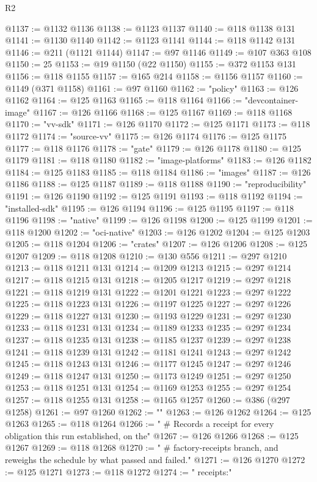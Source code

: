 \begin{lexlean}{R2}
\begin{coremodule}
@1137 := @1132 @1136
@1138 := @1123 @1137
@1140 := @118 @1138 @131
@1141 := @1130 @1140
@1142 := @1123 @1141
@1144 := @118 @1142 @131
@1146 := @211 (@1121 @1144)
@1147 := @97 @1146
@1149 := @107 @363 @108
@1150 := 25
@1153 := @19 @1150 (@22 @1150)
@1155 := @372 @1153 @131
@1156 := @118 @1155
@1157 := @165 @214
@1158 := @1156 @1157
@1160 := @1149 (@371 @1158)
@1161 := @97 @1160
@1162 := "policy"
@1163 := @126 @1162
@1164 := @125 @1163
@1165 := @118 @1164
@1166 := "devcontainer-image"
@1167 := @126 @1166
@1168 := @125 @1167
@1169 := @118 @1168
@1170 := "vv-sdk"
@1171 := @126 @1170
@1172 := @125 @1171
@1173 := @118 @1172
@1174 := "source-vv"
@1175 := @126 @1174
@1176 := @125 @1175
@1177 := @118 @1176
@1178 := "gate"
@1179 := @126 @1178
@1180 := @125 @1179
@1181 := @118 @1180
@1182 := "image-platforms"
@1183 := @126 @1182
@1184 := @125 @1183
@1185 := @118 @1184
@1186 := "images"
@1187 := @126 @1186
@1188 := @125 @1187
@1189 := @118 @1188
@1190 := "reproducibility"
@1191 := @126 @1190
@1192 := @125 @1191
@1193 := @118 @1192
@1194 := "installed-sdk"
@1195 := @126 @1194
@1196 := @125 @1195
@1197 := @118 @1196
@1198 := "native"
@1199 := @126 @1198
@1200 := @125 @1199
@1201 := @118 @1200
@1202 := "oci-native"
@1203 := @126 @1202
@1204 := @125 @1203
@1205 := @118 @1204
@1206 := "crates"
@1207 := @126 @1206
@1208 := @125 @1207
@1209 := @118 @1208
@1210 := @130 @556
@1211 := @297 @1210
@1213 := @118 @1211 @131
@1214 := @1209 @1213
@1215 := @297 @1214
@1217 := @118 @1215 @131
@1218 := @1205 @1217
@1219 := @297 @1218
@1221 := @118 @1219 @131
@1222 := @1201 @1221
@1223 := @297 @1222
@1225 := @118 @1223 @131
@1226 := @1197 @1225
@1227 := @297 @1226
@1229 := @118 @1227 @131
@1230 := @1193 @1229
@1231 := @297 @1230
@1233 := @118 @1231 @131
@1234 := @1189 @1233
@1235 := @297 @1234
@1237 := @118 @1235 @131
@1238 := @1185 @1237
@1239 := @297 @1238
@1241 := @118 @1239 @131
@1242 := @1181 @1241
@1243 := @297 @1242
@1245 := @118 @1243 @131
@1246 := @1177 @1245
@1247 := @297 @1246
@1249 := @118 @1247 @131
@1250 := @1173 @1249
@1251 := @297 @1250
@1253 := @118 @1251 @131
@1254 := @1169 @1253
@1255 := @297 @1254
@1257 := @118 @1255 @131
@1258 := @1165 @1257
@1260 := @386 (@297 @1258)
@1261 := @97 @1260
@1262 := ""
@1263 := @126 @1262
@1264 := @125 @1263
@1265 := @118 @1264
@1266 := "  # Records a receipt for every obligation this run established, on the"
@1267 := @126 @1266
@1268 := @125 @1267
@1269 := @118 @1268
@1270 := "  # factory-receipts branch, and reweighs the schedule by what passed and failed."
@1271 := @126 @1270
@1272 := @125 @1271
@1273 := @118 @1272
@1274 := "  receipts:"

\end{coremodule}
\end{lexlean}
